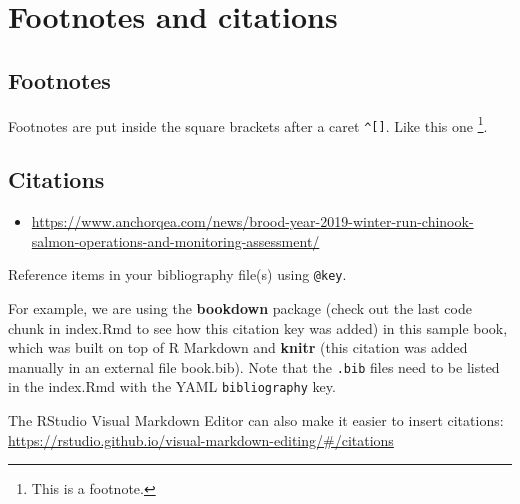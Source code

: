 \documentclass[
]{book}
\providecommand{\tightlist}{%
  \setlength{\itemsep}{0pt}\setlength{\parskip}{0pt}}
\theoremstyle{definition}
\theoremstyle{definition}
\theoremstyle{definition}
\theoremstyle{definition}
\theoremstyle{remark}
\begin{document}
\hypertarget{footnotes-and-citations-1}{%
\section{Footnotes and citations}\label{footnotes-and-citations-1}}

\hypertarget{footnotes-1}{%
\subsection{Footnotes}\label{footnotes-1}}

Footnotes are put inside the square brackets after a caret \texttt{\^{}{[}{]}}. Like this one \footnote{This is a footnote.}.

\hypertarget{citations-1}{%
\subsection{Citations}\label{citations-1}}

\begin{itemize}
\tightlist
\item
  \url{https://www.anchorqea.com/news/brood-year-2019-winter-run-chinook-salmon-operations-and-monitoring-assessment/}
\end{itemize}

Reference items in your bibliography file(s) using \texttt{@key}.

For example, we are using the \textbf{bookdown} package \citep{R-bookdown} (check out the last code chunk in index.Rmd to see how this citation key was added) in this sample book, which was built on top of R Markdown and \textbf{knitr} \citep{xie2015} (this citation was added manually in an external file book.bib). Note that the \texttt{.bib} files need to be listed in the index.Rmd with the YAML \texttt{bibliography} key.

The RStudio Visual Markdown Editor can also make it easier to insert citations: \url{https://rstudio.github.io/visual-markdown-editing/\#/citations}

  
\end{document}
